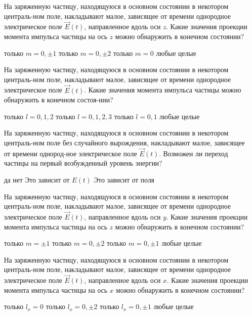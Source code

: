 \documentclass[11pt,a4paper]{exam}
\begin{document}
\begin{questions}
\question На заряженную частицу, находящуюся в основном состоянии в некотором централь-ном поле, накладывают малое, зависящее от времени однородное электрическое поле $\vec E(t)$, направленное вдоль оси $z$. Какие значения проекции момента импульса частицы на ось $z$ можно обнаружить в конечном состоянии?
\begin{choices}
\choice только $m = 0, \pm 1$      
\choice только $m = 0, \pm 2$
\choice только $m = 0$    
\choice любые целые
\end{choices}

\question На заряженную частицу, находящуюся в основном состоянии в некотором централь-ном поле, накладывают малое, зависящее от времени однородное электрическое поле $\vec E(t)$. Какие значения момента импульса частицы можно обнаружить в конечном состоя-нии?
\begin{choices}
\choice только $l = 0,1,2$      
\choice только $l = 0,1,2,3$
\choice только $l = 0,1$     
\choice любые целые
\end{choices}

\question На заряженную частицу, находящуюся в основном состоянии в некотором централь-ном поле без случайного вырождения, накладывают малое, зависящее от времени однород-ное электрическое поле $\vec E(t)$. Возможен ли переход частицы на первый возбужденный уровень энергии?
\begin{choices}
\choice да    
\choice нет      
\choice Это зависит от $E(t)$   
\choice Это зависит от поля
\end{choices}

\question На заряженную частицу, находящуюся в основном состоянии в некотором централь-ном поле, накладывают малое, зависящее от времени однородное электрическое поле $\vec E(t)$, направленное вдоль оси $y$. Какие значения проекции момента импульса частицы на ось $z$ можно обнаружить в конечном состоянии?
\begin{choices}
\choice только $m =  \pm 1$     
\choice только $m = 0, \pm 2$
\choice только $m = 0, \pm 1$      
\choice любые целые
\end{choices}

\question На заряженную частицу, находящуюся в основном состоянии в некотором централь-ном поле, накладывают малое, зависящее от времени однородное электрическое поле $\vec E(t)$, направленное вдоль оси $x$. Какие значения проекции момента импульса частицы на ось $x$ можно обнаружить в конечном состоянии?
\begin{choices}
\choice только ${l_x} = 0$      
\choice только ${l_x} = 0, \pm 2$
\choice только ${l_x} = 0, \pm 1$     
\choice любые целые
\end{choices}


\end{questions}
\end{document}
